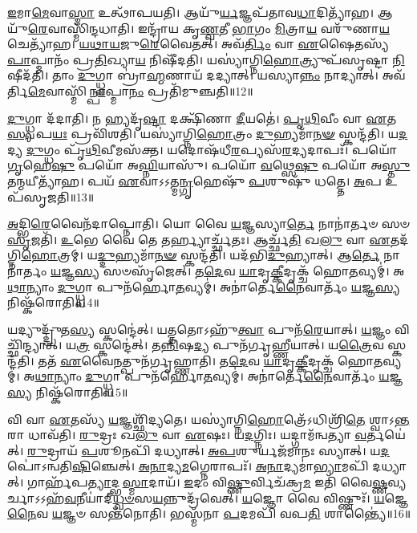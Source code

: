 \-\ul{𑌇}\-𑌮𑌾\-\ul{𑌮𑍇}\-𑌵𑌾\-\ul{𑌸𑍍𑌮𑌾} 𑌉𑌤𑍍𑌥𑌾᳴𑌪𑌯𑌤𑌿।
𑌆𑌯𑍁᳴\-\ul{𑌰𑍍𑌯}\-𑌜𑍍𑌞𑌪᳴𑌤𑌾𑌵\-\ul{𑌧𑌾}\-𑌦𑌿𑌤𑍍𑌯𑌾᳴𑌹।
𑌆𑌯𑍁᳴\-\ul{𑌰𑍇}\-𑌵𑌾𑌸𑍍𑌮𑌿᳴𑌨𑍍𑌦𑌧𑌾𑌤𑌿।
𑌇𑌨𑍍𑌦𑍍𑌰𑌾᳴𑌯 𑌕𑍃\-\ul{𑌣𑍍𑌵}\-𑌤𑍀 \ul{𑌭𑌾}\-𑌗𑌂 \ul{𑌮𑌿}\-𑌤𑍍𑌰𑌾\-\ul{𑌯} 𑌵𑌰𑍁᳴𑌣𑌾\-\ul{𑌯} 𑌚𑍇𑌤𑍍𑌯𑌾᳴𑌹।
\-\ul{𑌯}\-\-\ul{𑌥𑌾}\-\-\ul{𑌯}\-𑌜𑍁\-\ul{𑌰𑍇}\-𑌵𑍈𑌤𑌤𑍍।
𑌅𑌵᳴\-\ul{𑌰𑍍𑌤𑌿𑌂} 𑌵𑌾 \ul{𑌏}\-𑌷𑍈𑌤𑌸𑍍𑌯᳴ \ul{𑌪𑌾}\-𑌪𑍍𑌮𑌾𑌨𑌂᳴ 𑌪𑍍𑌰\-\ul{𑌤𑌿}\-𑌖𑍍𑌯𑌾\-\ul{𑌯} 𑌨𑌿𑌷𑍀᳴𑌦𑌤𑌿।
𑌯𑌸𑍍𑌯𑌾॑𑌗𑍍𑌨𑌿\-\ul{𑌹𑍋}\-𑌤𑍍𑌰𑍍𑌯𑍁𑌪᳴𑌸𑍃𑌷𑍍𑌟𑌾 \ul{𑌨𑌿}\-𑌷𑍀𑌦᳴𑌤𑌿।
𑌤𑌾𑌂 \ul{𑌦𑍁}\-𑌗𑍍𑌧𑍍𑌵𑌾 𑌬𑍍𑌰𑌾॑\-\ul{𑌹𑍍𑌮}\-𑌣𑌾𑌯᳴ 𑌦𑌦𑍍𑌯𑌾𑌤𑍍।
𑌯𑌸𑍍𑌯𑌾\-\ul{𑌨𑍍𑌨𑌂} 𑌨𑌾𑌦𑍍𑌯𑌾𑌤𑍍।
𑌅𑌵᳴𑌰𑍍𑌤𑌿\-\ul{𑌮𑍇}\-𑌵𑌾𑌸𑍍𑌮𑌿᳴\-\ul{𑌨𑍍𑌪𑌾}\-𑌪𑍍𑌮𑌾\-\ul{𑌨𑌂} 𑌪𑍍𑌰𑌤𑌿᳴\-𑌮𑍁𑌞𑍍𑌚𑌤𑌿॥12॥

\-\ul{𑌦𑍁}\-𑌗𑍍𑌧𑍍𑌵𑌾 𑌦᳴𑌦𑌾𑌤𑌿।
𑌨 𑌹𑍍𑌯𑌦𑍃᳴\-\ul{𑌷𑍍𑌟𑌾} 𑌦𑌕𑍍𑌷𑌿᳴𑌣𑌾 \ul{𑌦𑍀}\-𑌯𑌤𑍇॑।
\-\ul{𑌪𑍃}\-\-\ul{𑌥𑌿}\-𑌵𑍀𑌂 𑌵𑌾 \ul{𑌏}\-𑌤\-\ul{𑌸𑍍𑌯} 𑌪\-\ul{𑌯𑌃} 𑌪𑍍𑌰𑌵𑌿᳴𑌶𑌤𑌿।
𑌯𑌸𑍍𑌯𑌾॑𑌗𑍍𑌨𑌿\-\ul{𑌹𑍋}\-𑌤𑍍𑌰𑌂 \ul{𑌦𑍁}\-𑌹𑍍𑌯𑌮𑌾᳴\-\ul{𑌨}\-\-\ul{𑍟} 𑌸𑍍𑌕𑌨𑍍𑌦᳴𑌤𑌿।
𑌯\-\ul{𑌦}\-𑌦𑍍𑌯 \ul{𑌦𑍁}\-𑌗𑍍𑌧𑌂 𑌪𑍃᳴\-\ul{𑌥𑌿}\-𑌵𑍀𑌮𑌸᳴𑌕𑍍𑌤।
𑌯𑌦𑍋𑌷᳴𑌧𑍀\-\ul{𑌰}\-𑌪𑍍𑌯𑌸᳴\-\ul{𑌰}\-𑌦𑍍𑌯𑌦𑌾𑌪𑌃᳴।
𑌪𑌯𑍋᳴ \ul{𑌗𑍃}\-𑌹𑍇\-\ul{𑌷𑍁} 𑌪𑌯𑍋᳴ 𑌅\-\ul{𑌘𑍍𑌨𑌿}\-𑌯𑌾𑌸𑍁᳴।
𑌪𑌯𑍋᳴ \ul{𑌵}\-𑌥𑍍𑌸𑍇\-\ul{𑌷𑍁} 𑌪𑌯𑍋᳴ 𑌅\-\ul{𑌸𑍍𑌤𑍁} 𑌤𑌨𑍍𑌮𑌯𑍀𑌤𑍍𑌯𑌾᳴𑌹।
𑌪𑌯᳴ \ul{𑌏}\-𑌵𑌾𑌽𑌽𑌤𑍍𑌮\-\ul{𑌨𑍍𑌗𑍃}\-𑌹𑍇𑌷𑍁᳴ \ul{𑌪}\-𑌶𑍁𑌷𑍁᳴ 𑌧𑌤𑍍𑌤𑍇।
\-\ul{𑌅}\-𑌪 𑌉𑌪᳴\-𑌸𑍃𑌜𑌤𑌿॥13॥

\-\ul{𑌅}\-𑌦𑍍𑌭𑌿\-\ul{𑌰𑍇}\-𑌵𑍈𑌨᳴𑌦𑌾𑌪𑍍𑌨𑍋𑌤𑌿।
𑌯𑍋 𑌵𑍈 \ul{𑌯}\-𑌜𑍍𑌞𑌸𑍍𑌯𑌾\-\ul{𑌰𑍍𑌤𑍇} 𑌨𑌾𑌨𑌾॑𑌰𑍍𑌤𑍞 𑌸𑍞\-\ul{𑌸𑍃}\-𑌜𑌤𑌿᳴।
\-\ul{𑌉}\-𑌭𑍇 𑌵𑍈 𑌤𑍇 𑌤𑌰𑍍𑌹𑍍𑌯𑌾𑌰𑍍𑌚𑍍𑌛᳴𑌤𑌃।
𑌆𑌰𑍍𑌚𑍍𑌛᳴\-\ul{𑌤𑌿} 𑌖\-\ul{𑌲𑍁} 𑌵𑌾 \ul{𑌏}\-𑌤𑌦᳴𑌗𑍍𑌨𑌿\-\ul{𑌹𑍋}\-𑌤𑍍𑌰𑌮𑍍।
𑌯\-\ul{𑌦𑍍𑌦𑍁}\-𑌹𑍍𑌯𑌮𑌾᳴\-\ul{𑌨}\-\-\ul{𑍟} 𑌸𑍍𑌕𑌨𑍍𑌦᳴𑌤𑌿।
𑌯𑌦᳴𑌭𑌿\-\ul{𑌦𑍁}\-𑌹𑍍𑌯𑌾𑌤𑍍।
𑌆\-\ul{𑌰𑍍𑌤𑍇} 𑌨𑌾𑌨𑌾॑𑌰𑍍𑌤𑌂 \ul{𑌯}\-𑌜𑍍𑌞\-\ul{𑌸𑍍𑌯} 𑌸𑍞𑌸𑍃᳴𑌜𑍇𑌤𑍍।
𑌤\-\ul{𑌦𑍇}\-𑌵 \ul{𑌯𑌾}\-𑌦𑍃\-\ul{𑌕𑍍𑌕𑍀}\-𑌦𑍃𑌕𑍍𑌚᳴ 𑌹𑍋\-\ul{𑌤}\-𑌵𑍍𑌯𑌮𑍍॑।
𑌅\-\ul{𑌥𑌾}\-𑌨𑍍𑌯𑌾𑌂 \ul{𑌦𑍁}\-𑌗𑍍𑌧𑍍𑌵𑌾 𑌪𑍁𑌨᳴𑌰𑍍\mbox{}𑌹𑍋\-\ul{𑌤}\-𑌵𑍍𑌯𑌮𑍍॑।
𑌅𑌨𑌾॑𑌰𑍍𑌤𑍇\-\ul{𑌨𑍈}\-𑌵𑌾𑌰𑍍𑌤𑌂᳴ \ul{𑌯}\-𑌜𑍍𑌞\-\ul{𑌸𑍍𑌯} 𑌨𑌿𑌷𑍍𑌕᳴𑌰𑍋𑌤𑌿॥14॥

𑌯𑌦𑍍𑌯𑍁𑌦𑍍𑌦𑍍𑌰𑍁᳴𑌤\-\ul{𑌸𑍍𑌯} 𑌸𑍍𑌕𑌨𑍍𑌦𑍇॑𑌤𑍍।
𑌯𑌤𑍍𑌤𑌤𑍋\-𑌽𑌹𑍁᳴\-\ul{𑌤𑍍𑌵𑌾} 𑌪𑍁𑌨᳴\-\ul{𑌰𑍇}\-𑌯𑌾𑌤𑍍।
\-\ul{𑌯}\-𑌜𑍍𑌞𑌂 𑌵𑌿𑌚𑍍𑌛𑌿᳴𑌨𑍍𑌦𑍍𑌯𑌾𑌤𑍍।
𑌯\-\ul{𑌤𑍍𑌰} 𑌸𑍍𑌕𑌨𑍍𑌦𑍇॑𑌤𑍍।
𑌤\-\ul{𑌨𑍍𑌨𑌿}\-𑌷\-\ul{𑌦𑍍𑌯} 𑌪𑍁𑌨᳴𑌰𑍍𑌗𑍃𑌹𑍍𑌣𑍀𑌯𑌾𑌤𑍍।
𑌯\-\ul{𑌤𑍍𑌰𑍈}\-𑌵 𑌸𑍍𑌕𑌨𑍍𑌦᳴𑌤𑌿।
𑌤𑌤᳴ \ul{𑌏}\-𑌵𑍈\-\ul{𑌨}\-𑌤𑍍𑌪𑍁𑌨᳴𑌰𑍍𑌗𑍃𑌹𑍍𑌣𑌾𑌤𑌿।
𑌤\-\ul{𑌦𑍇}\-𑌵 \ul{𑌯𑌾}\-𑌦𑍃\-\ul{𑌕𑍍𑌕𑍀}\-𑌦𑍃𑌕𑍍𑌚᳴ 𑌹𑍋\-\ul{𑌤}\-𑌵𑍍𑌯𑌮𑍍॑।
𑌅\-\ul{𑌥𑌾}\-𑌨𑍍𑌯𑌾𑌂 \ul{𑌦𑍁}\-𑌗𑍍𑌧𑍍𑌵𑌾 𑌪𑍁𑌨᳴𑌰𑍍\mbox{}𑌹𑍋\-\ul{𑌤}\-𑌵𑍍𑌯𑌮𑍍॑।
𑌅𑌨𑌾॑𑌰𑍍𑌤𑍇\-\ul{𑌨𑍈}\-𑌵𑌾𑌰𑍍𑌤𑌂᳴ \ul{𑌯}\-𑌜𑍍𑌞\-\ul{𑌸𑍍𑌯} 𑌨𑌿𑌷𑍍𑌕᳴𑌰𑍋𑌤𑌿॥15॥

𑌵𑌿 𑌵𑌾 \ul{𑌏}\-𑌤𑌸𑍍𑌯᳴ \ul{𑌯}\-𑌜𑍍𑌞𑌶𑍍𑌛𑌿᳴𑌦𑍍𑌯𑌤𑍇।
𑌯𑌸𑍍𑌯𑌾॑𑌗𑍍𑌨𑌿\-\ul{𑌹𑍋}\-𑌤𑍍𑌰𑍇᳴\-𑌽𑌧𑌿𑌶𑍍𑌰𑌿᳴\-\ul{𑌤𑍇} 𑌶𑍍𑌵𑌾\-𑌽\-\ul{𑌨𑍍𑌤}\-𑌰𑌾 𑌧𑌾𑌵᳴𑌤𑌿।
\-\ul{𑌰𑍁}\-𑌦𑍍𑌰𑌃 𑌖\-\ul{𑌲𑍁} 𑌵𑌾 \ul{𑌏}\-𑌷𑌃।
𑌯\-\ul{𑌦}\-𑌗𑍍𑌨𑌿𑌃।
𑌯𑌦𑍍𑌗𑌾𑌮᳴𑌨𑍍𑌵𑌤𑍍𑌯𑌾 \ul{𑌵}\-𑌰𑍍𑌤𑌯𑍇॑𑌤𑍍।
\-\ul{𑌰𑍁}\-𑌦𑍍𑌰𑌾𑌯᳴ \ul{𑌪}\-𑌶𑍂𑌨𑌪𑌿᳴ 𑌦𑌧𑍍𑌯𑌾𑌤𑍍।
\-\ul{𑌅}\-\-\ul{𑌪}\-𑌶𑍁𑌰𑍍𑌯𑌜᳴𑌮𑌾𑌨𑌃 𑌸𑍍𑌯𑌾𑌤𑍍।
𑌯\-\ul{𑌦}\-𑌪𑍋॑\-𑌽𑌨𑍍𑌵𑌤𑌿\-\ul{𑌷𑌿}\-𑌞𑍍𑌚𑍇𑌤𑍍।
\-\ul{𑌅}\-\-\ul{𑌨𑌾}\-𑌦𑍍𑌯\-\ul{𑌮}\-𑌗𑍍𑌨𑍇𑌰𑌾𑌪𑌃᳴।
\-\ul{𑌅}\-\-\ul{𑌨𑌾}\-𑌦𑍍𑌯𑌮𑌾॑\-\ul{𑌭𑍍𑌯𑌾}\-𑌮𑌪𑌿᳴ 𑌦𑌧𑍍𑌯𑌾𑌤𑍍।
𑌗𑌾𑌰𑍍\mbox{}𑌹᳴𑌪\-\ul{𑌤𑍍𑌯𑌾}\-𑌦𑍍𑌭\-\ul{𑌸𑍍𑌮𑌾}\-𑌦𑌾𑌯᳴।
\-\ul{𑌇}\-𑌦𑌂 𑌵𑌿\-\ul{𑌷𑍍𑌣𑍁}\-𑌰𑍍𑌵𑌿𑌚᳴𑌕𑍍𑌰\-\ul{𑌮} 𑌇𑌤𑌿᳴ 𑌵𑍈\-\ul{𑌷𑍍𑌣}\-𑌵𑍍𑌯𑌰𑍍𑌚𑌾\-𑌽𑌽𑌹᳴\-\ul{𑌵}\-𑌨𑍀𑌯𑌾॑𑌦𑍍‌\-\ul{𑌧𑍍𑌵}\-\-\ul{𑍞}\-𑌸\-\ul{𑌯}\-𑌨𑍍𑌨𑍁𑌦𑍍𑌰᳴𑌵𑍇𑌤𑍍।
\-\ul{𑌯}\-𑌜𑍍𑌞𑍋 𑌵𑍈 𑌵𑌿𑌷𑍍𑌣𑍁𑌃᳴।
\-\ul{𑌯}\-𑌜𑍍𑌞𑍇\-\ul{𑌨𑍈}\-𑌵 \ul{𑌯}\-𑌜𑍍𑌞𑍞 𑌸𑌨𑍍𑌤᳴𑌨𑍋𑌤𑌿।
𑌭𑌸𑍍𑌮᳴𑌨𑌾 \ul{𑌪}\-𑌦𑌮𑌪𑌿᳴ 𑌵𑌪\-\ul{𑌤𑌿} 𑌶𑌾𑌨𑍍𑌤𑍍𑌯𑍈॑॥16॥\anuvakamend[𑌵𑍈 \ul{𑌦𑍇}\-𑌵𑍍𑌯𑌦𑌿᳴𑌤𑌿𑌰𑍍𑌮𑍁𑌞𑍍𑌚𑌤𑌿 𑌸𑍃𑌜𑌤𑌿 𑌕𑌰𑍋𑌤𑌿 𑌕𑌰𑍋𑌤𑍍𑌯𑌾\-\ul{𑌭𑍍𑌯𑌾}\-𑌮𑌪𑌿᳴ 𑌦\-\ul{𑌧𑍍𑌯𑌾}\-𑌤𑍍 𑌪𑌞𑍍𑌚᳴ 𑌚]

